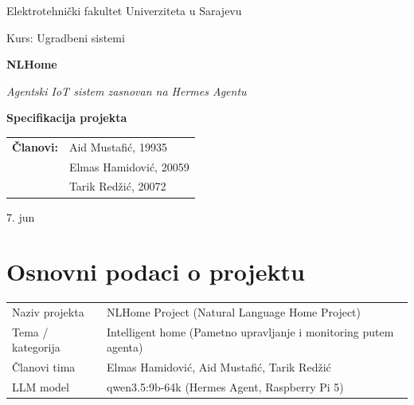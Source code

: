 \documentclass[11pt,a4paper]{article}
\begin{document}
\begin{titlepage}
      \centering
      {\large Elektrotehnički fakultet Univerziteta u Sarajevu\par}
      {\large Kurs: Ugradbeni sistemi\par}
      \vspace{2.5cm}

      {\Huge\bfseries NLHome \par}
      \vspace{0.6cm}
      {\large\itshape Agentski IoT sistem zasnovan na Hermes Agentu\par}

      \vspace{2.5cm}
      {\large\bfseries Specifikacija projekta\par}
      \vspace{2.0cm}

      \begin{tabular}{rl}
            \textbf{Članovi:} & Aid Mustafić, 19935    \\
                              & Elmas Hamidović, 20059 \\
                              & Tarik Redžić, 20072    \\
      \end{tabular}

      \vfill
      {\large 7. jun \the\year}
\end{titlepage}

\section{Osnovni podaci o projektu}

\begin{tabularx}{\textwidth}{@{}l X@{}}
      \toprule
      Naziv projekta    & NLHome Project (Natural Language Home Project)                   \\
      Tema / kategorija & Intelligent home (Pametno upravljanje i monitoring putem agenta) \\
      Članovi tima      & Elmas Hamidović, Aid Mustafić, Tarik Redžić                      \\
      LLM model         & qwen3.5:9b-64k (Hermes Agent, Raspberry Pi 5)                    \\
      \bottomrule
\end{tabularx}
\end{document}
